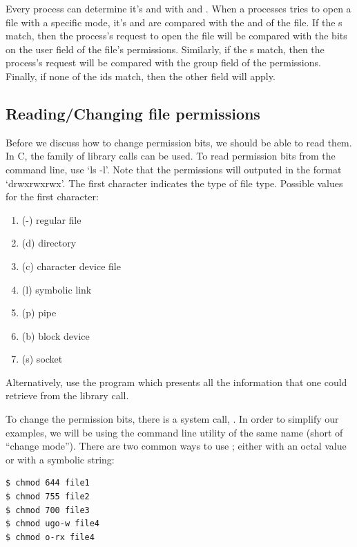 Every process can determine it's  and  with  and . When a processes tries to open a file with a specific mode, it's  and  are compared with the  and  of the file. If the s match, then the process's request to open the file will be compared with the bits on the user field of the file's permissions. Similarly, if the s match, then the process's request will be compared with the group field of the permissions. Finally, if none of the ids match, then the other field will apply.

\subsection{Reading/Changing file permissions}

Before we discuss how to change permission bits, we should be able to read them. In C, the  family of library calls can be used. To read permission bits from the command line, use `ls -l'. Note that the permissions will outputed in the format `drwxrwxrwx'. The first character indicates the type of file type. Possible values for the first character:

\begin{enumerate}
\item (-) regular file
\item (d) directory
\item (c) character device file
\item (l) symbolic link
\item (p) pipe
\item (b) block device
\item (s) socket
\end{enumerate}

Alternatively, use the program  which presents all the information that one could retrieve from the  library call.

To change the permission bits, there is a system call, . In order to simplify our examples, we will be using the command line utility of the same name  (short of ``change mode''). There are two common ways to use  ; either with an octal value or with a symbolic string:

\begin{verbatim}
$ chmod 644 file1
$ chmod 755 file2
$ chmod 700 file3
$ chmod ugo-w file4
$ chmod o-rx file4
\end{verbatim}

